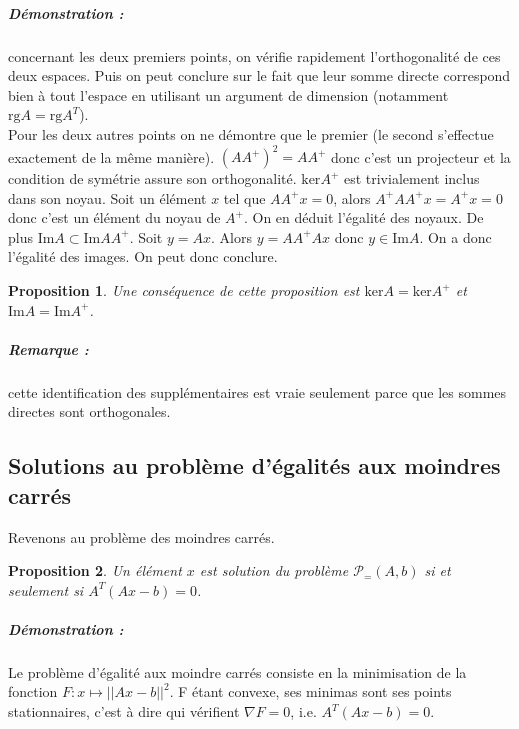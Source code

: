 \documentclass[10pt,a4paper]{article}
\newtheorem{prop}{Proposition}
\begin{document}
\subparagraph{Démonstration :} concernant les deux premiers points, on vérifie rapidement l'orthogonalité de ces deux espaces.
Puis on peut conclure sur le fait que leur somme directe correspond bien à tout l'espace en utilisant un argument de dimension (notamment $\text{rg}A=\text{rg}A^T$).\\
Pour les deux autres points on ne démontre que le premier (le second s'effectue exactement de la même manière). $(AA^+)^2=AA^+$ donc c'est un projecteur et la condition de symétrie assure son orthogonalité. $\text{ker}A^+$ est trivialement inclus dans son noyau.
Soit un élément $x$ tel que $AA^+x=0$, alors $A^+AA^+x=A^+x=0$ donc c'est un élément du noyau de $A^+$.
On en déduit l'égalité des noyaux.
De plus $\text{Im}A \subset \text{Im}AA^+$.
Soit $y=Ax$.
Alors $y=AA^+Ax$ donc $y \in \text{Im}A$.
On a donc l'égalité des images.
On peut donc conclure.
\begin{prop}
Une conséquence de cette proposition est $\text{ker}A=\text{ker}A^+$ et $\text{Im}A=\text{Im}A^+$.
\end{prop}
\subparagraph{Remarque :} cette identification des supplémentaires est vraie seulement parce que les sommes directes sont orthogonales.\\

\subsection{Solutions au problème d'égalités aux moindres carrés}

Revenons au problème des moindres carrés.
\begin{prop}
  Un élément $x$ est solution du problème $\mathcal{P}_{=}(A, b)$ si et seulement si $A^T(Ax-b)=0$.
\end{prop}
\subparagraph{Démonstration :}
Le problème d'égalité aux moindre carrés consiste en la minimisation de la fonction $F: x \mapsto ||Ax - b||^2$.
F étant convexe, ses minimas sont ses points stationnaires, c'est à dire qui vérifient $\nabla F = 0$, i.e. $A^T(Ax - b) = 0$.
\end{document}
